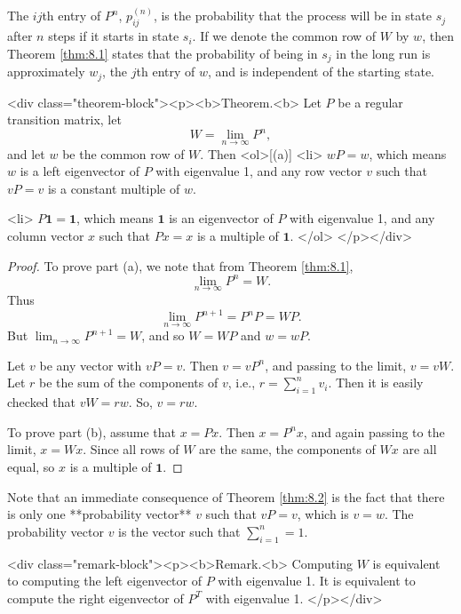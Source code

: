 The $ij$th entry of $P^n$, $p^{(n)}_{ij}$, is the probability that the process will be in state $s_j$ after $n$ steps if it starts in state $s_i$. If we denote the common row of $W$ by $w$, then Theorem \ref{thm:8.1} states that the probability of being in $s_j$ in the long run is approximately $w_j$, the $j$th entry of $w$, and is independent of the starting state. 

<div class="theorem-block"><p><b>Theorem.<b> 
\label{thm:8.2}
Let $P$ be a regular transition matrix, let
$$\begin{equation}
    W = \lim_{n\to\infty} P^n,
\end{equation}$$
and let $w$ be the common row of $W$. Then
<ol>[(a)]
    <li> 
    $wP = w$, which means $w$ is a left eigenvector of $P$ with eigenvalue 1, and any row vector $v$ such that $vP = v$ is a constant multiple of $w$.
    
    <li> 
    $P\mathbf{1} = \mathbf{1}$, which means $\mathbf{1}$ is an eigenvector of $P$ with eigenvalue 1, and any column vector $x$ such that $Px = x$ is a multiple of $\mathbf{1}$.
</ol>
</p></div>

\begin{proof}
To prove part (a), we note that from Theorem \ref{thm:8.1}, 
$$\begin{equation}
    \lim_{n\to\infty} P^n = W.
\end{equation}$$
Thus
$$\begin{equation}
    \lim_{n\to\infty} P^{n+1} = P^n P = W P.
\end{equation}$$
But $\lim_{n\to\infty} P^{n+1} = W$, and so $W = WP$ and $w = wP$.

Let $v$ be any vector with $vP = v$. Then $v = vP^n$, and passing to the limit, $v = vW$. Let $r$ be the sum of the components of $v$, i.e., $r = \sum_{i=1}^n v_i$. Then it is easily checked that $vW = rw$. So, $v = rw$.

To prove part (b), assume that $x = Px$. Then $x = P^n x$, and again passing to the limit, $x = Wx$. Since all rows of $W$ are the same, the components of $Wx$ are all equal, so $x$ is a multiple of $\mathbf{1}$.
\end{proof}

Note that an immediate consequence of Theorem \ref{thm:8.2} is the fact that there is only one **probability vector** $v$ such that $vP = v$, which is $v = w$. The probability vector $v$ is the vector such that $\sum_{i=1}^n = 1$.

<div class="remark-block"><p><b>Remark.<b> 
Computing $W$ is equivalent to computing the left eigenvector of $P$ with eigenvalue 1. It is equivalent to compute the right eigenvector of $P^T$ with eigenvalue 1.
</p></div>

